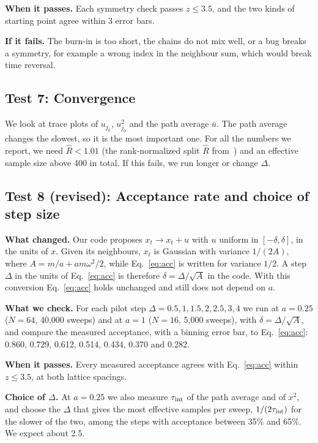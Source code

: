\documentclass[11pt]{article}
\begin{document}
\textbf{When it passes.} Each symmetry check passes $z\le3.5$, and the two
kinds of starting point agree within 3 error bars.

\textbf{If it fails.} The burn-in is too short, the chains do not mix well, or a
bug breaks a symmetry, for example a wrong index in the neighbour sum, which
would break time reversal.

\subsection*{Test 7: Convergence}
We look at trace plots of $u_{j_0}$, $u_{j_0}^2$ and the path average $\bar u$. The path average changes the slowest, so it is the most important one. For all the numbers we report, we need $\hat R < 1.01$ (the rank-normalized split $\hat R$ from~\cite{vehtari}) and an effective sample size above 400 in total. If this fails, we run longer or change $\Delta$.

\subsection*{Test 8 (revised): Acceptance rate and choice of step size}

\textbf{What changed.} Our code proposes $x_t\to x_t+u$ with $u$ uniform in
$[-\delta,\delta]$, in the units of $x$. Given its neighbours, $x_t$ is
Gaussian with variance $1/(2A)$, where $A=m/a+am\omega^2/2$, while
Eq.~\eqref{eq:acc} is written for variance $1/2$. A step $\Delta$ in the units
of Eq.~\eqref{eq:acc} is therefore $\delta=\Delta/\sqrt{A}$ in the code. With
this conversion Eq.~\eqref{eq:acc} holds unchanged and still does not depend
on $a$.

\textbf{What we check.} For each pilot step $\Delta=0.5,1,1.5,2,2.5,3,4$ we run
at $a=0.25$ ($N=64$, 40{,}000 sweeps) and at $a=1$ ($N=16$, 5{,}000 sweeps), with
$\delta=\Delta/\sqrt{A}$, and compare the measured acceptance, with a binning
error bar, to Eq.~\eqref{eq:acc}: 0.860, 0.729, 0.612, 0.514, 0.434, 0.370 and
0.282.

\textbf{When it passes.} Every measured acceptance agrees with
Eq.~\eqref{eq:acc} within $z\le3.5$, at both lattice spacings.

\textbf{Choice of $\Delta$.} At $a=0.25$ we also measure $\tau_{\rm int}$ of the
path average and of $x^2$, and choose the $\Delta$ that gives the most
effective samples per sweep, $1/(2\tau_{\rm int})$ for the slower of the two,
among the steps with acceptance between 35\% and 65\%. We expect about 2.5.
\end{document}
